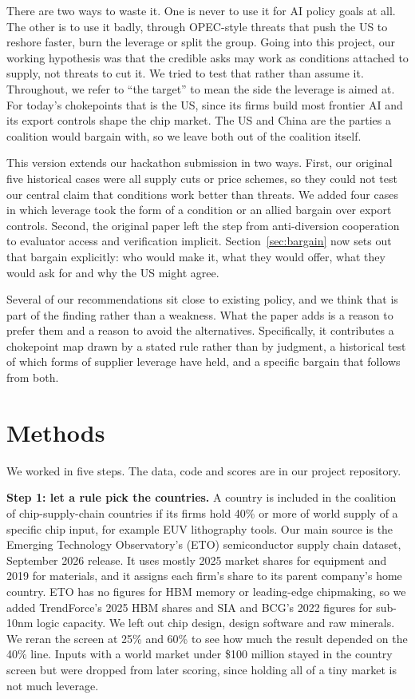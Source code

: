 \documentclass[11pt]{article}
\begin{document}
There are two ways to waste it. One is never to use it for AI policy goals at all. The other is to use it badly, through OPEC-style threats that push the US to reshore faster, burn the leverage or split the group. Going into this project, our working hypothesis was that the credible asks may work as conditions attached to supply, not threats to cut it. We tried to test that rather than assume it. Throughout, we refer to ``the target'' to mean the side the leverage is aimed at. For today's chokepoints that is the US, since its firms build most frontier AI and its export controls shape the chip market. The US and China are the parties a coalition would bargain with, so we leave both out of the coalition itself.

This version extends our hackathon submission in two ways. First, our original five historical cases were all supply cuts or price schemes, so they could not test our central claim that conditions work better than threats. We added four cases in which leverage took the form of a condition or an allied bargain over export controls. Second, the original paper left the step from anti-diversion cooperation to evaluator access and verification implicit. Section~\ref{sec:bargain} now sets out that bargain explicitly: who would make it, what they would offer, what they would ask for and why the US might agree.

Several of our recommendations sit close to existing policy, and we think that is part of the finding rather than a weakness. What the paper adds is a reason to prefer them and a reason to avoid the alternatives. Specifically, it contributes a chokepoint map drawn by a stated rule rather than by judgment, a historical test of which forms of supplier leverage have held, and a specific bargain that follows from both.

\section{Methods}

We worked in five steps. The data, code and scores are in our project repository.

\textbf{Step 1: let a rule pick the countries.} A country is included in the coalition of chip-supply-chain countries if its firms hold 40\% or more of world supply of a specific chip input, for example EUV lithography tools. Our main source is the Emerging Technology Observatory's (ETO) semiconductor supply chain dataset, September 2026 release. It uses mostly 2025 market shares for equipment and 2019 for materials, and it assigns each firm's share to its parent company's home country. ETO has no figures for HBM memory or leading-edge chipmaking, so we added TrendForce's 2025 HBM shares and SIA and BCG's 2022 figures for sub-10nm logic capacity. We left out chip design, design software and raw minerals. We reran the screen at 25\% and 60\% to see how much the result depended on the 40\% line. Inputs with a world market under \$100 million stayed in the country screen but were dropped from later scoring, since holding all of a tiny market is not much leverage.
\end{document}
